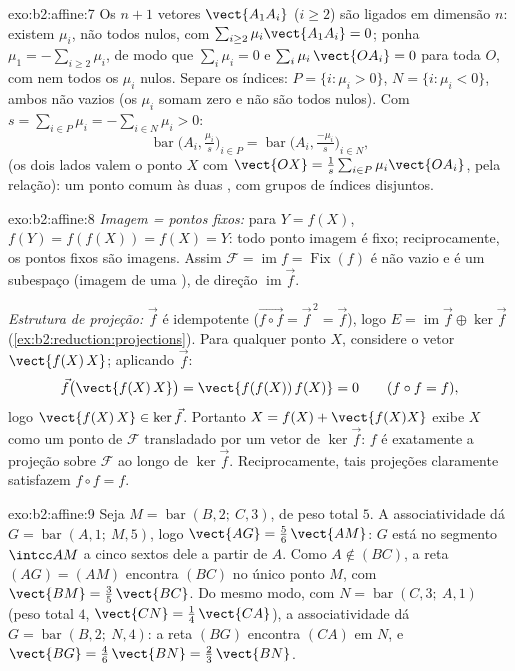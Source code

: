 \begin{solution}{exo:b2:affine:7}
Os $n + 1$ vetores $\vect{A_1A_i}$ ($i \geq 2$) são ligados em
dimensão $n$: existem $\mu_i$, não todos nulos, com $\sum_{i\geq2}
\mu_i\vect{A_1A_i} = 0$; ponha $\mu_1 = -\sum_{i \geq 2}\mu_i$, de modo que
$\sum_{i}\mu_i = 0$ e $\sum_i \mu_i\,\vect{OA_i} = 0$ para toda
$O$, com nem todos os $\mu_i$ nulos. Separe os índices: $P = \{i : \mu_i >
0\}$, $N = \{i : \mu_i < 0\}$, ambos não vazios (os $\mu_i$ somam
zero e não são todos nulos). Com $s = \sum_{i\in P}\mu_i =
-\sum_{i \in N}\mu_i > 0$:
\[
\operatorname{bar}\bigl(A_i, \tfrac{\mu_i}{s}\bigr)_{i \in P}
= \operatorname{bar}\bigl(A_i, \tfrac{-\mu_i}{s}\bigr)_{i \in N},
\]
(os dois lados valem o ponto $X$ com $\vect{OX} = \frac1s\sum_{i\in
P}\mu_i\vect{OA_i}$, pela relação): um ponto comum às duas
, com grupos de índices disjuntos.
\end{solution}

\begin{solution}{exo:b2:affine:8}
\emph{Imagem = pontos fixos:} para $Y = f(X)$, $f(Y) = f(f(X)) =
f(X) = Y$: todo ponto imagem é fixo; reciprocamente, os pontos fixos são
imagens. Assim $\mathcal{F} = \operatorname{im} f =
\operatorname{Fix}(f)$ é não vazio e é um subespaço 
(imagem de uma ), de direção $\operatorname{im}\vec f$.

\emph{Estrutura de projeção:} $\vec f$ é idempotente ($\vec{f\circ
f} = \vec f^{\,2} = \vec f$), logo $E = \operatorname{im}\vec f
\oplus \ker \vec f$ (\cref{ex:b2:reduction:projections}). Para qualquer
ponto $X$, considere o vetor $\vect{f(X)\,X}$; aplicando $\vec f$:
\[
\vec f\bigl(\vect{f(X)\,X}\bigr) = \vect{f(f(X))\,f(X)} = 0
\qquad (f \circ f = f),
\]
logo $\vect{f(X)\,X} \in \ker\vec f$. Portanto $X = f(X) +
\vect{f(X)X}$ exibe $X$ como um ponto de $\mathcal{F}$ transladado
por um vetor de $\ker\vec f$: $f$ é exatamente a projeção sobre
$\mathcal{F}$ ao longo de $\ker\vec f$. Reciprocamente, tais projeções
claramente satisfazem $f \circ f = f$.
\end{solution}

\begin{solution}{exo:b2:affine:9}
Seja $M = \operatorname{bar}(B, 2;\ C, 3)$, de peso total $5$.
A associatividade dá $G = \operatorname{bar}(A, 1;\ M, 5)$, logo
$\vect{AG} = \frac56\,\vect{AM}$: $G$ está no segmento
$\intcc AM$ a cinco sextos dele a partir de $A$. Como $A \notin
(BC)$, a reta $(AG) = (AM)$ encontra $(BC)$ no único ponto
$M$, com $\vect{BM} = \frac35\,\vect{BC}$. Do mesmo modo, com $N =
\operatorname{bar}(C, 3;\ A, 1)$ (peso total $4$, $\vect{CN}
= \frac14\,\vect{CA}$), a associatividade dá $G =
\operatorname{bar}(B, 2;\ N, 4)$: a reta $(BG)$ encontra $(CA)$
em $N$, e $\vect{BG} = \frac46\,\vect{BN} =
\frac23\,\vect{BN}$.
\end{solution}

